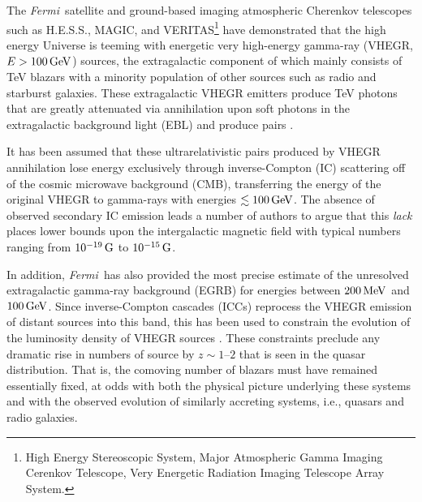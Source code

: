 \documentclass[usenatbib,iop,apj,numberedappendix]{aeb_emulateapj_2015}
\def\eV{{\rm eV}} %
\def\MeV{{\rm M}\eV} %
\def\GeV{{\rm G}\eV} %
\def\G{{\rm G}}
\def\Fermi{{\em Fermi\ }}
\begin{document}
The \Fermi satellite and ground-based imaging atmospheric Cherenkov telescopes such as
H.E.S.S., MAGIC, and VERITAS\footnote{High Energy
  Stereoscopic System, Major Atmospheric Gamma Imaging Cerenkov Telescope, Very
  Energetic Radiation Imaging Telescope Array System.} have demonstrated that the high
energy Universe is teeming with energetic very high-energy gamma-ray 
(VHEGR, $E > 100\,\GeV$) sources, the extragalactic component of which mainly consists of TeV
blazars with a minority population of other sources  such as radio
and starburst galaxies. These extragalactic VHEGR emitters produce TeV photons that are greatly attenuated via annihilation upon soft photons in the extragalactic background light
(EBL) and produce pairs \citep[see, e.g.,][]{Goul-Schr:67,Sala-Stec:98,Nero-Semi:09}.

It has been assumed that these ultrarelativistic pairs produced by VHEGR annihilation 
lose energy exclusively through inverse-Compton (IC) scattering off of the cosmic microwave
background (CMB),   transferring the energy of the original VHEGR to gamma-rays with
energies $\lesssim100\,\GeV$.  The absence of observed secondary IC emission leads a number of
authors to argue that this \textit{lack} places lower bounds upon the
intergalactic magnetic field
\citep[IGMF; see, e.g.,][]{Nero-Vovk:10,Tave_etal:10a,Tave_etal:10b,Derm_etal:10,Tayl-Vovk-Nero:11,Taka_etal:11,Dola_etal:11} with 
typical numbers ranging from $10^{-19}\,\G$ to $10^{-15}\,\G$.  

In addition, \Fermi has also provided the most precise estimate of the unresolved
extragalactic gamma-ray background (EGRB) for energies between
$200\,\MeV$ and $100\,\GeV$.  Since inverse-Compton cascades (ICCs) reprocess the VHEGR emission of
distant sources into this band, this has been used to constrain the
evolution of the luminosity density of VHEGR sources
\citep[see, e.g., ][]{Naru-Tota:06,Knei-Mann:08,Inou-Tota:09,Vent:10}.
These constraints preclude any dramatic rise in numbers of source by $z\sim1$--$2$ that is seen in the quasar
distribution.  That is, the comoving number of blazars must have
remained essentially fixed, at odds with both the physical picture
underlying these systems and with the observed evolution of similarly
accreting systems, i.e., quasars and radio galaxies.
\end{document}
